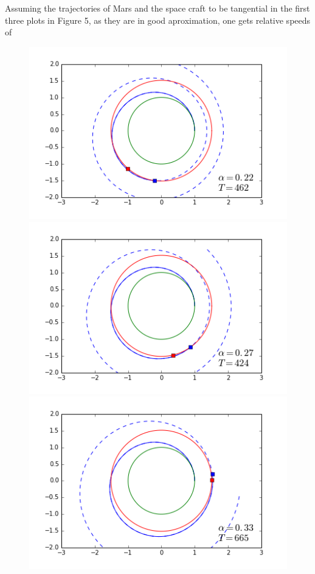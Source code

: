 \documentclass[twocolumn,12pt,a4paper]{article}
\numberwithin{equation}{section}
\begin{document}
Assuming the trajectories of Mars and the space craft to be tangential in the first three plots in Figure 5, as they are in good aproximation, one gets relative speeds of



\begin{figure}
	\centering
	\includegraphics[scale=0.5]{simulacio1.png}
	\includegraphics[scale=0.5]{simulacio2.png}
	\includegraphics[scale=0.5]{simulacio3.png}

\end{figure}
\end{document}
